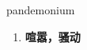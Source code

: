 
\begin{frame}
{\huge pandemonium}
\begin{center}
\begin{enumerate}\Large
  \item \textbf{喧嚣，骚动}
\end{enumerate}
\end{center}
\end{frame}
